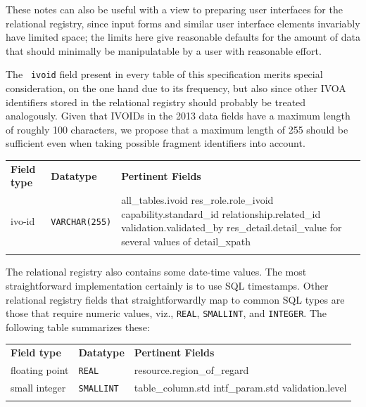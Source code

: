 \documentclass[11pt,a4paper]{ivoa}
\newcommand{\rtent}[1]{\texttt{\color{rtcolor} #1}}
\begin{document}
These notes can also be useful with a view to preparing user interfaces for
the relational registry, since input forms and similar user interface
elements invariably have limited space; the limits here give reasonable
defaults for the amount of data that should minimally be manipulatable
by a user with reasonable effort.

The \rtent{ivoid} field present in every table of this
specification merits special consideration, on the one hand due to its
frequency, but also since other IVOA identifiers stored in the
relational registry should probably be treated analogously.
Given that IVOIDs in the 2013 data fields have a maximum
length of roughly 100 characters, we propose that a maximum length of 
255 should be sufficient even when taking possible fragment identifiers
into account.

\begin{inlinetable}
\begin{tabular}{llp{6cm}}
\sptablerule
\textbf{Field type}&
\textbf{Datatype}&
\textbf{Pertinent Fields}\\
\sptablerule
ivo-id&\texttt{VARCHAR(255)}&
          {all\_tables}.ivoid\hfil\break
          res\_role.role\_ivoid\hfil\break
          capability.standard\_id\hfil\break
          relationship.related\_id\hfil\break
          validation.validated\_by\hfil\break
          res\_detail.detail\_value for several values of detail\_xpath\\
\sptablerule
\end{tabular}
\end{inlinetable}

The relational registry also contains some date-time values. The most
straightforward implementation certainly is to use SQL timestamps.
Other relational registry fields that straightforwardly map to common
SQL types are those that require numeric values, viz.,
\texttt{REAL}, \texttt{SMALLINT}, and
\texttt{INTEGER}.  The following table summarizes these:


\begin{inlinetable}
\begin{tabular}{llp{6cm}}
\sptablerule
\textbf{Field type}&
\textbf{Datatype}&
\textbf{Pertinent Fields}\\
\sptablerule
floating point&\texttt{REAL}&resource.region\_of\_regard\\
\sptablerule
small integer&\texttt{SMALLINT}&table\_column.std\hfil\break
          intf\_param.std\hfil\break
          validation.level\\
\sptablerule
\end{tabular}
\end{inlinetable}
\end{document}
